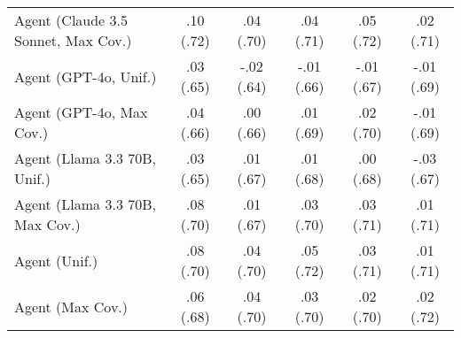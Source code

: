 \begin{table}[h!]
\begin{tabular}{lccccc}
    Agent (Claude 3.5 Sonnet, Max Cov.) & \cellcolor{gold!30}.10 {\small (.72)} & .04 {\small (.70)} & .04 {\small (.71)} & \cellcolor{gold!30}.05 {\small (.72)} & .02 {\small (.71)} \\
    Agent (GPT-4o, Unif.) & .03 {\small (.65)} & -.02 {\small (.64)} & -.01 {\small (.66)} & -.01 {\small (.67)} & -.01 {\small (.69)} \\
    Agent (GPT-4o, Max Cov.) & .04 {\small (.66)} & .00 {\small (.66)} & .01 {\small (.69)} & .02 {\small (.70)} & -.01 {\small (.69)} \\
    Agent (Llama 3.3 70B, Unif.) & .03 {\small (.65)} & .01 {\small (.67)} & .01 {\small (.68)} & .00 {\small (.68)} & -.03 {\small (.67)} \\
    Agent (Llama 3.3 70B, Max Cov.) & .08 {\small (.70)} & .01 {\small (.67)} & .03 {\small (.70)} & .03 {\small (.71)} & .01 {\small (.71)} \\
    Agent (Unif.) & .08 {\small (.70)} & .04 {\small (.70)} & \cellcolor{silver!30}.05 {\small (.72)} & .03 {\small (.71)} & .01 {\small (.71)} \\
    Agent (Max Cov.) & .06 {\small (.68)} & \cellcolor{silver!30}.04 {\small (.70)} & .03 {\small (.70)} & .02 {\small (.70)} & .02 {\small (.72)} \\
    \bottomrule
    \end{tabular}
\end{table}